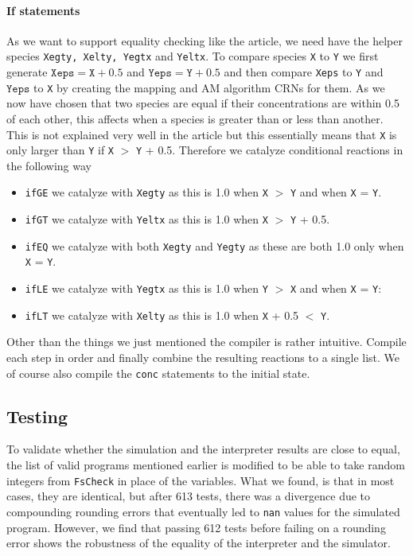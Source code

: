 \paragraph{If statements}
As we want to support equality checking like the article, we need have the helper species \texttt{Xegty, Xelty, Yegtx} and \texttt{Yeltx}. To compare species \texttt{X} to \texttt{Y} we first generate $\texttt{Xeps} = \texttt{X} + 0.5$ and $\texttt{Yeps} = \texttt{Y} + 0.5$ and then compare \texttt{Xeps} to \texttt{Y} and $\texttt{Yeps}$ to \texttt{X} by creating the mapping and AM algorithm CRNs for them. As we now have chosen that two species are equal if their concentrations are within 0.5 of each other, this affects when a species is greater than or less than another. This is not explained very well in the article but this essentially means that \texttt{X} is only larger than \texttt{Y} if \texttt{X} $>$ \texttt{Y} + 0.5. Therefore we catalyze conditional reactions in the following way
\begin{itemize}
    \item \texttt{ifGE} we catalyze with \texttt{Xegty} as this is 1.0 when \texttt{X} $>$ \texttt{Y} and when \texttt{X} = \texttt{Y}.
    \item \texttt{ifGT} we catalyze with \texttt{Yeltx} as this is 1.0 when \texttt{X}  $>$ \texttt{Y} + 0.5.
    \item \texttt{ifEQ} we catalyze with both \texttt{Xegty} and \texttt{Yegty} as these are both 1.0 only when \texttt{X} = \texttt{Y}.
    \item \texttt{ifLE} we catalyze with \texttt{Yegtx} as this is 1.0 when \texttt{Y} $>$ \texttt{X} and when \texttt{X} = \texttt{Y}:
    \item \texttt{ifLT} we catalyze with \texttt{Xelty} as this is 1.0 when \texttt{X} + 0.5  $<$ \texttt{Y}.

\end{itemize}

Other than the things we just mentioned the compiler is rather intuitive. Compile each step in order and finally combine the resulting reactions to a single list. We of course also compile the \texttt{conc} statements to the initial state.



\subsection{Testing}
To validate whether the simulation and the interpreter results are close to equal, the list of valid programs mentioned earlier is modified to be able to take random integers from \texttt{FsCheck} in place of the variables. What we found, is that in most cases, they are identical, but after 613 tests, there was a divergence due to compounding rounding errors that eventually led to \texttt{nan} values for the simulated program.
However, we find that passing 612 tests before failing on a rounding error shows the robustness of the equality of the interpreter and the simulator.


